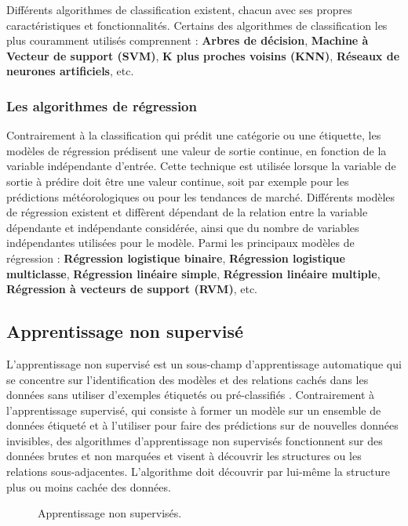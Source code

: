 Différents algorithmes de classification existent, chacun avec ses propres caractéristiques et fonctionnalités. Certains des algorithmes de classification les plus couramment utilisés comprennent : \textbf{Arbres de décision}, \textbf{Machine à Vecteur de support (SVM)}, \textbf{K plus proches voisins (KNN)}, \textbf{Réseaux de neurones artificiels}, etc.

\subsubsection{Les algorithmes de régression}
Contrairement à la classification qui prédit une catégorie ou une étiquette, les modèles de régression prédisent une valeur de sortie continue, en fonction de la variable indépendante d’entrée. Cette technique est utilisée lorsque la variable de sortie à prédire doit être une valeur continue, soit par exemple pour les prédictions météorologiques ou pour les tendances de marché. Différents modèles de régression existent et diffèrent dépendant de la relation entre la variable dépendante et indépendante considérée, ainsi que du nombre de variables indépendantes utilisées pour le modèle. Parmi les principaux modèles de régression : \textbf{Régression logistique binaire}, \textbf{Régression logistique multiclasse}, \textbf{Régression linéaire simple}, \textbf{Régression linéaire multiple}, \textbf{Régression à vecteurs de support (RVM)}, etc.

\subsection{Apprentissage non supervisé}
L'apprentissage non supervisé est un sous-champ d'apprentissage automatique qui se concentre sur l'identification des modèles et des relations cachés dans les données sans utiliser d'exemples étiquetés ou pré-classifiés \cite{sublime2022}. Contrairement à l'apprentissage supervisé, qui consiste à former un modèle sur un ensemble de données étiqueté et à l'utiliser pour faire des prédictions sur de nouvelles données invisibles, des algorithmes d'apprentissage non supervisés fonctionnent sur des données brutes et non marquées et visent à découvrir les structures ou les relations sous-adjacentes. L'algorithme doit découvrir par lui-même la structure plus ou moins cachée des données.
\begin{figure}[H]%
    \center%
    \setlength{\fboxsep}{5pt}%
    \setlength{\fboxrule}{0.5pt}%
    \caption{Apprentissage non supervisés.}%
\end{figure}


